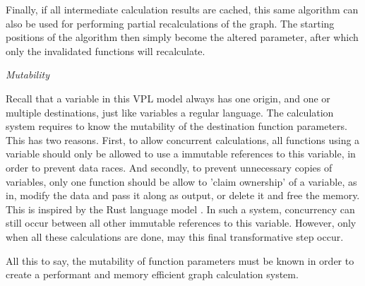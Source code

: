Finally, if all intermediate calculation results are cached, this same algorithm can also be used for performing partial recalculations of the graph. 
The starting positions of the algorithm then simply become the altered parameter, after which only the invalidated functions will recalculate. 

\emph{Mutability}

Recall that a variable in this VPL model always has one origin, and one or multiple destinations, just like variables a regular language.
The calculation system requires to know the mutability of the destination function parameters. 
This has two reasons.
First, to allow concurrent calculations, all functions using a variable should only be allowed to use a immutable references to this variable, in order to prevent data races. 
And secondly, to prevent unnecessary copies of variables, only one function should be allow to 'claim ownership' of a variable, as in, modify the data and pass it along as output, or delete it and free the memory. 
This is inspired by the Rust language model \citep{contributors_what_2022}. 
In such a system, concurrency can still occur between all other immutable references to this variable.
However, only when all these calculations are done, may this final transformative step occur.

All this to say, the mutability of function parameters must be known in order to create a performant and memory efficient graph calculation system.  






